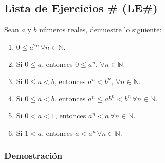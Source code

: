 \documentclass[11pt]{article}
\newcommand{\N}{\mathbb{N}}
\begin{document}
\subsection*{Lista de Ejercicios \# (LE\#)}

Sean $a$ y $b$ números reales, demuestre lo siguiente:

\begin{enumerate}[label=\alph*)]
    \item $0 \leq a^{2n} \, \forall n\in \N$.
    \item Si $0\leq a$, entonces $ 0 \leq a^n, \, \forall n\in \N$.
    \item Si $0 \leq a <b$, entonces $a^n < b^n, \, \forall n\in \N$.
    \item Si $0 \leq a <b$, entonces $a^n \leq ab^n < b^n \, \forall n\in \N$.
    \item Si $0<a<1$, entonces $a^n<a \, \forall n\in \N$.
    \item Si $1<a$, entonces $a<a^n \, \forall n\in \N$.
\end{enumerate}

\subsubsection*{Demostración}
\end{document}
